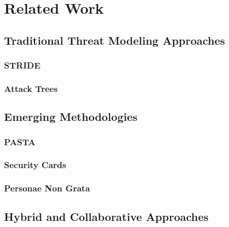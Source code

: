 
%

\chapter{Related Work}
\label{cha:related_work}

\glsresetall

\section{Traditional Threat Modeling Approaches}
\label{sec:traditional_threat_modeling}

\subsection{STRIDE}
\label{subsec:stride}

\subsection{Attack Trees}
\label{subsec:attack_trees}

\section{Emerging Methodologies}
\label{sec:emerging_methodologies}

\subsection{PASTA}
\label{subsec:pasta}

\subsection{Security Cards}
\label{subsec:security_cards}

\subsection{Personae Non Grata}
\label{subsec:personae_non_grata}

\section{Hybrid and Collaborative Approaches}
\label{sec:hybrid_collaborative_approaches}

